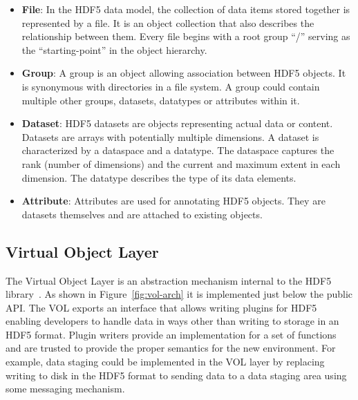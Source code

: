 \documentclass[conference]{IEEEtran}
\begin{document}
\begin{itemize}

\item
  \textbf{File}: In the HDF5 data model, the collection of data items stored
  together is represented by a file. It is an object collection that also
  describes the relationship between them. Every file begins with a root
  group ``/'' serving as the ``starting-point'' in the object hierarchy.

\item
  \textbf{Group}: A group is an object allowing association between HDF5
  objects. It is synonymous with directories in a file system. A group
  could contain multiple other groups, datasets, datatypes or attributes within
  it.

\item
  \textbf{Dataset}: HDF5 datasets are objects representing actual data
  or content. Datasets are arrays with potentially multiple dimensions. A
  dataset is characterized by a dataspace and a datatype. The dataspace
  captures the rank (number of dimensions) and the current and maximum
  extent in each dimension. The datatype describes the type of its data
  elements.

\item
  \textbf{Attribute}: Attributes are used for annotating HDF5 objects. They are
  datasets themselves and are attached to existing objects.

\end{itemize}


\subsection{Virtual Object Layer}
\label{virtual-object-layer}

The Virtual Object Layer is an abstraction mechanism internal to the HDF5
library~\cite{hdf5}. As shown in Figure~\ref{fig:vol-arch} it is implemented
just below the public API. The VOL exports an interface that allows writing
plugins for HDF5 enabling developers to handle data in ways other than writing
to storage in an HDF5 format.  Plugin writers provide an implementation for a
set of functions and are trusted to provide the proper semantics for the new
environment. For example, data staging could be implemented in the VOL layer by
replacing writing to disk in the HDF5 format to sending data to a data staging
area using some messaging mechanism.
\end{document}
